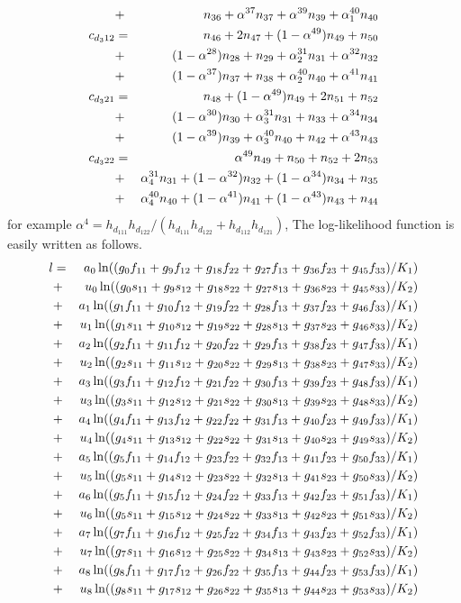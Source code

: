 \begin{eqnarray*}
         &+&n_{36}+\alpha^{37} n_{37}+\alpha^{39} n_{39}+\alpha^{40}_1 n_{40}\cr
c_{d_312}&=&n_{46}+2 n_{47}+(1-\alpha^{49} )n_{49}+n_{50}\cr
         &+&(1-\alpha^{28}) n_{28}+n_{29}+\alpha^{31}_2 n_{31}+\alpha^{32} n_{32}\cr
         &+&(1-\alpha^{37}) n_{37}+n_{38}+\alpha^{40}_2 n_{40}+\alpha^{41} n_{41}\cr
c_{d_321}&=&n_{48}+(1-\alpha^{49} )n_{49}+2n_{51}+n_{52}\cr
         &+&(1-\alpha^{30}) n_{30}+\alpha^{31}_3 n_{31}+n_{33}+\alpha^{34} n_{34}\cr
         &+&(1-\alpha^{39}) n_{39}+\alpha^{40}_3 n_{40}+n_{42}+\alpha^{43} n_{43}\cr
c_{d_322}&=&\alpha^{49} n_{49}+n_{50}+n_{52}+2n_{53}\cr
         &+&\alpha^{31}_4 n_{31}+(1-\alpha^{32}) n_{32}+(1-\alpha^{34}) n_{34}+n_{35}\cr
         &+&\alpha^{40}_4 n_{40}+(1-\alpha^{41}) n_{41}+(1-\alpha^{43}) n_{43}+n_{44}\cr
\end{eqnarray*}
for example $\alpha^4=h_{d_111}h_{d_122}/(h_{d_111}h_{d_122}+h_{d_112}h_{d_121})$,
The log-likelihood function is easily written as follows.
\begin{eqnarray*}
l&=&  a_0 \ln ((g_0  f_{11}+g_{9}  f_{12}+g_{18} f_{22}+g_{27}f_{13}+g_{36} f_{23}+g_{45} f_{33})/K_1) \cr
 &+&  u_0 \ln ((g_0  s_{11}+g_{9}  s_{12}+g_{18} s_{22}+g_{27}s_{13}+g_{36} s_{23}+g_{45} s_{33})/K_2) \cr
 &+&  a_1 \ln ((g_1  f_{11}+g_{10} f_{12}+g_{19} f_{22}+g_{28}f_{13}+g_{37} f_{23}+g_{46} f_{33})/K_1) \cr
 &+&  u_1 \ln ((g_1  s_{11}+g_{10} s_{12}+g_{19} s_{22}+g_{28}s_{13}+g_{37} s_{23}+g_{46} s_{33})/K_2) \cr
 &+&  a_2 \ln ((g_2  f_{11}+g_{11} f_{12}+g_{20} f_{22}+g_{29}f_{13}+g_{38} f_{23}+g_{47} f_{33})/K_1) \cr
 &+&  u_2 \ln ((g_2  s_{11}+g_{11} s_{12}+g_{20} s_{22}+g_{29}s_{13}+g_{38} s_{23}+g_{47} s_{33})/K_2) \cr
 &+&  a_3 \ln ((g_3  f_{11}+g_{12} f_{12}+g_{21} f_{22}+g_{30}f_{13}+g_{39} f_{23}+g_{48} f_{33})/K_1) \cr
 &+&  u_3 \ln ((g_3  s_{11}+g_{12} s_{12}+g_{21} s_{22}+g_{30}s_{13}+g_{39} s_{23}+g_{48} s_{33})/K_2) \cr
 &+&  a_4 \ln ((g_4  f_{11}+g_{13} f_{12}+g_{22} f_{22}+g_{31}f_{13}+g_{40} f_{23}+g_{49} f_{33})/K_1) \cr
 &+&  u_4 \ln ((g_4  s_{11}+g_{13} s_{12}+g_{22} s_{22}+g_{31}s_{13}+g_{40} s_{23}+g_{49} s_{33})/K_2) \cr
 &+&  a_5 \ln ((g_5  f_{11}+g_{14} f_{12}+g_{23} f_{22}+g_{32}f_{13}+g_{41} f_{23}+g_{50} f_{33})/K_1) \cr
 &+&  u_5 \ln ((g_5  s_{11}+g_{14} s_{12}+g_{23} s_{22}+g_{32}s_{13}+g_{41} s_{23}+g_{50} s_{33})/K_2) \cr
 &+&  a_6 \ln ((g_5  f_{11}+g_{15} f_{12}+g_{24} f_{22}+g_{33}f_{13}+g_{42} f_{23}+g_{51} f_{33})/K_1) \cr
 &+&  u_6 \ln ((g_5  s_{11}+g_{15} s_{12}+g_{24} s_{22}+g_{33}s_{13}+g_{42} s_{23}+g_{51} s_{33})/K_2) \cr
 &+&  a_7 \ln ((g_7  f_{11}+g_{16} f_{12}+g_{25} f_{22}+g_{34}f_{13}+g_{43} f_{23}+g_{52} f_{33})/K_1) \cr
 &+&  u_7 \ln ((g_7  s_{11}+g_{16} s_{12}+g_{25} s_{22}+g_{34}s_{13}+g_{43} s_{23}+g_{52} s_{33})/K_2) \cr
 &+&  a_8 \ln ((g_8  f_{11}+g_{17} f_{12}+g_{26} f_{22}+g_{35}f_{13}+g_{44} f_{23}+g_{53} f_{33})/K_1) \cr
 &+&  u_8 \ln ((g_8  s_{11}+g_{17} s_{12}+g_{26} s_{22}+g_{35}s_{13}+g_{44} s_{23}+g_{53} s_{33})/K_2) \cr
\end{eqnarray*}
